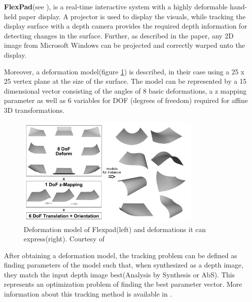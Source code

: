 \documentclass[]{article}
\begin{document}

\textbf{FlexPad}(see \cite{steimle13}), is a real-time interactive system with a highly deformable hand-held paper display. A projector is used to display the visuals, while tracking the display surface with a depth camera provides the required depth information for detecting changes in the surface. Further, as described in the paper, any 2D image from Microsoft Windows can be projected and correctly warped unto the display. 



Moreover, a deformation model(figure \ref{fig:flexpad_deformation}) is described, in their case using a 25 x 25 vertex plane at the size of the surface. The model can be represented by a 15 dimensional vector consisting of the angles of 8 basic deformations, a z mapping parameter as well as 6 variables for DOF (degrees of freedom) required for affine 3D transformations. 

\begin{figure}[hbtp]
    \centering
    \includegraphics[width=0.8\textwidth]{figures/FlexpadDeformationModel.PNG}
    \caption{Deformation model of Flexpad(left) and deformations it can express(right). Courtesy of \cite{steimle13}}
    \label{fig:flexpad_deformation}
\end{figure}


After obtaining a deformation model, the tracking problem can be defined as finding parameters of the model such that, when synthesized as a depth image, they match the input depth image best(Analysis by Synthesis or AbS). This represents an optimization problem of finding the best parameter vector. More information about this tracking method is available in \cite{steimle13}.
\end{document}
